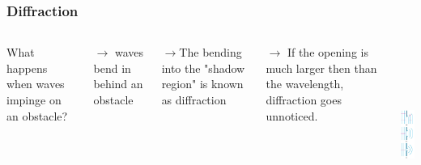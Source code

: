 \documentclass[]{beamer}
\begin{document}
\begin{frame}

\frametitle{Diffraction}





   \begin{columns}[c]
   \column{2.8in}  %

  What happens when waves impinge on an obstacle?
\pause


 $\rightarrow$ waves bend in behind an obstacle
\pause
\vspace{3mm}

 $\rightarrow$The bending into the "shadow region" is known as diffraction
\pause

\vspace{3mm}

 $\rightarrow$ If the opening is much larger then than the wavelength, diffraction goes unnoticed. 
\pause



   \column{1.4in}

  \begin{center}
  \includegraphics[height=2.3in]{images5/diffraction.jpg}
\end{center}

   \end{columns}




  \end{frame}




\end{document}
